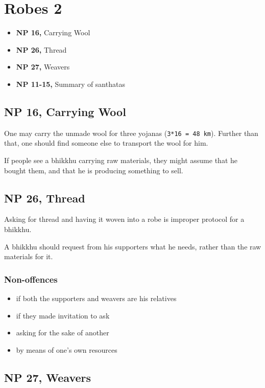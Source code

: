 \chapter{Robes 2}

\begin{itemize}
\tightlist
\item
  \textbf{NP 16,} Carrying Wool
\item
  \textbf{NP 26,} Thread
\item
  \textbf{NP 27,} Weavers
\item
  \textbf{NP 11-15,} Summary of santhatas
\end{itemize}

\section{NP 16, Carrying Wool}

One may carry the unmade wool for three yojanas
(\texttt{3*16\ =\ 48\ km}). Further than that, one should find someone
else to transport the wool for him.

If people see a bhikkhu carrying raw materials, they might assume that
he bought them, and that he is producing something to sell.

\section{NP 26, Thread}

Asking for thread and having it woven into a robe is improper protocol
for a bhikkhu.

A bhikkhu should request from his supporters what he needs, rather than
the raw materials for it.

\subsection{Non-offences}

\begin{itemize}
\tightlist
\item
  if both the supporters and weavers are his relatives
\item
  if they made invitation to ask
\item
  asking for the sake of another
\item
  by means of one's own resources
\end{itemize}

\section{NP 27, Weavers}

